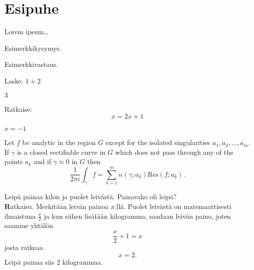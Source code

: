 


\chapter{Esipuhe}



Lorem ipsum\ldots


\begin{tehtava}
Esimerkkikysymys.
\begin{vastaus}	
Esimerkkivastaus.
\end{vastaus}
\end{tehtava}

\begin{tehtava}
Laske: $1+2$
\begin{vastaus}
$3$
\end{vastaus}
\end{tehtava}

\begin{tehtava}
Ratkaise:
\[
x=2x+1
\]


\begin{vastaus}
$x=-1$
\end{vastaus}
\end{tehtava}


\begin{theorem}
Let $f$ be analytic in the region $G$ except for the isolated singularities $a_1,a_2,\ldots,a_m$. If $\gamma$ is a closed rectifiable curve in $G$ which does not pass through any of the points $a_k$ and if $\gamma\approx 0$ in $G$ then
\[
\frac{1}{2\pi i}\int_\gamma f = \sum_{k=1}^m n(\gamma;a_k) \text{Res}(f;a_k).
\]
\end{theorem}

\begin{esimerkki}
Leipä painaa kilon ja puolet leivästä. Painavako oli leipä?\\
{\textbf Ratkaisu.} Merkitään leivän painoa $x$:llä. Puolet leivästä on matemaattisesti ilmaistuna $\frac{x}{2}$ ja kun siihen lisätään kilogramma, saadaan leivän paino, joten saamme yhtälön
\begin{equation}
\frac{x}{2}+1=x
\end{equation}
josta ratkeaa
\begin{equation}
x=2.
\end{equation}
Leipä painaa siis 2 kilogrammaa.
\end{esimerkki}


